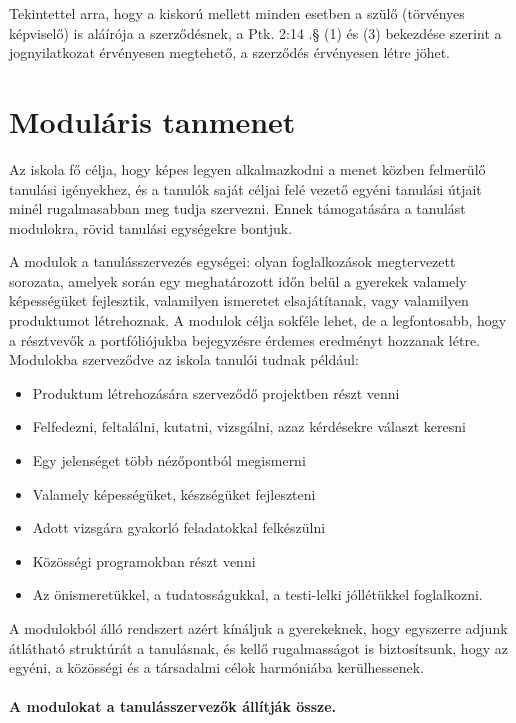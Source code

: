 Tekintettel arra, hogy a kiskorú mellett minden esetben a szülő (törvényes
képviselő) is aláírója a szerződésnek, a Ptk. 2:14 .§ (1) és (3) bekezdése
szerint a jognyilatkozat érvényesen megtehető, a szerződés érvényesen létre
jöhet.

\section{Moduláris tanmenet}
\label{sec:modularis_tanmenet}

Az iskola fő célja, hogy képes legyen alkalmazkodni a menet közben felmerülő
tanulási igényekhez, és a tanulók saját céljai felé vezető egyéni tanulási
útjait minél rugalmasabban meg tudja szervezni. Ennek támogatására a tanulást
modulokra, rövid tanulási egységekre bontjuk.

A modulok a tanulásszervezés egységei: olyan foglalkozások megtervezett
sorozata, amelyek során egy meghatározott időn belül a gyerekek valamely
képességüket fejlesztik, valamilyen ismeretet elsajátítanak, vagy valamilyen
produktumot létrehoznak. A modulok célja sokféle lehet, de a legfontosabb, hogy
a résztvevők a portfóliójukba bejegyzésre érdemes eredményt hozzanak létre.
Modulokba szerveződve az iskola tanulói tudnak például:

\begin{itemize}
  \item Produktum létrehozására szerveződő projektben részt venni
  \item Felfedezni, feltalálni, kutatni, vizsgálni, azaz kérdésekre választ
        keresni
  \item Egy jelenséget több nézőpontból megismerni
  \item Valamely képességüket, készségüket fejleszteni
  \item Adott vizsgára gyakorló feladatokkal felkészülni
  \item Közösségi programokban részt venni
  \item Az önismeretükkel, a tudatosságukkal, a testi-lelki jóllétükkel
        foglalkozni.
\end{itemize}

A modulokból álló rendszert azért kínáljuk a gyerekeknek, hogy egyszerre adjunk
átlátható struktúrát a tanulásnak, és kellő rugalmasságot is biztosítsunk, hogy
az egyéni, a közösségi és a társadalmi célok harmóniába kerülhessenek.

\paragraph{A modulokat a tanulásszervezők állítják össze.}

